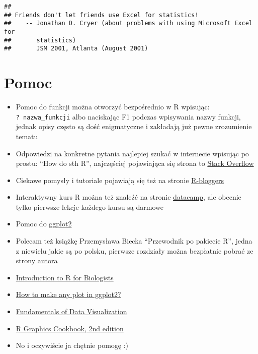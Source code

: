 \documentclass[
]{book}
\providecommand{\tightlist}{%
  \setlength{\itemsep}{0pt}\setlength{\parskip}{0pt}}
\begin{document}
\begin{verbatim}
## 
## Friends don't let friends use Excel for statistics!
##    -- Jonathan D. Cryer (about problems with using Microsoft Excel for
##       statistics)
##       JSM 2001, Atlanta (August 2001)
\end{verbatim}

\hypertarget{pomoc}{%
\section{Pomoc}\label{pomoc}}

\begin{itemize}
\tightlist
\item
  Pomoc do funkcji można otworzyć bezpośrednio w R wpisując: \texttt{?\ nazwa\_funkcji} albo naciskając F1 podczas wpisywania nazwy funkcji, jednak opisy często są dość enigmatyczne i zakładają już pewne zrozumienie tematu
\item
  Odpowiedzi na konkretne pytania najlepiej szukać w internecie wpisując po prostu: ``How do sth R'', najczęściej pojawiająca się strona to \href{http://stackoverflow.com/}{Stack Overflow}
\item
  Ciekawe pomysły i tutoriale pojawiają się też na stronie \href{http://www.r-bloggers.com/}{R-bloggers}
\item
  Interaktywny kurs R można też znaleźć na stronie \href{https://www.datacamp.com}{datacamp}, ale obecnie tylko pierwsze lekcje każdego kursu są darmowe
\item
  Pomoc do \href{http://docs.ggplot2.org/current/}{ggplot2}
\item
  Polecam też książkę Przemysława Biecka ``Przewodnik po pakiecie R'', jedna z niewielu jakie są po polsku, pierwsze rozdziały można bezpłatnie pobrać ze strony \href{http://www.biecek.pl/}{autora}
\item
  \href{https://melbournebioinformatics.github.io/r-intro-biologists/intro_r_biologists.html\#R_for_Biologists_course}{Introduction to R for Biologists}
\item
  \href{http://r-statistics.co/ggplot2-Tutorial-With-R.html}{How to make any plot in ggplot2?}
\item
  \href{https://clauswilke.com/dataviz/index.html}{Fundamentals of Data Visualization}
\item
  \href{https://r-graphics.org/index.html}{R Graphics Cookbook, 2nd edition}
\item
  No i oczywiście ja chętnie pomogę :)
\end{itemize}
\end{document}
